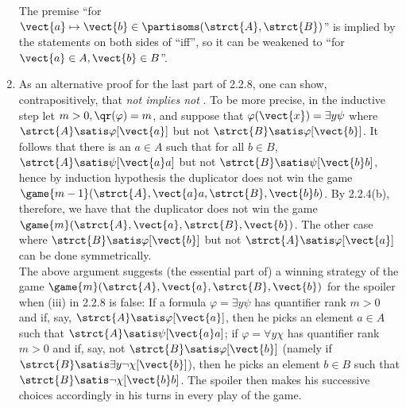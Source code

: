 \begin{enumerate}[1.]
\begin{remark}
The premise ``for $\vect{a} \mapsto \vect{b} \in \partisoms(\strct{A}, \strct{B})$'' is implied by the statements on both sides of ``iff'', so it can be weakened to ``for $\vect{a} \in A, \vect{b} \in B$''.
\end{remark}
%
\item {} As an alternative proof for the last part of 2.2.8, one can show, contrapositively, that \emph{not  implies not }. To be more precise, in the inductive step let $m > 0, \qr(\varphi) = m$, and suppose that $\varphi(\vect{x}) = \exists y \psi$ where $\strct{A} \satis \varphi[\vect{a}]$ but not $\strct{B} \satis \varphi[\vect{b}]$. It follows that there is an $a \in A$ such that for all $b \in B$, $\strct{A} \satis \psi[\vect{a}a]$ but not $\strct{B} \satis \psi[\vect{b}b]$, hence by induction hypothesis the duplicator does not win the game $\game{m - 1}(\strct{A}, \vect{a}a, \strct{B}, \vect{b}b)$. By 2.2.4(b), therefore, we have that the duplicator does not win the game $\game{m}(\strct{A}, \vect{a}, \strct{B}, \vect{b})$. The other case where $\strct{B} \satis \varphi[\vect{b}]$ but not $\strct{A} \satis \varphi[\vect{a}]$ can be done symmetrically.
\medskip\\
The above argument suggests (the essential part of) a winning strategy of the game $\game{m}(\strct{A}, \vect{a}, \strct{B}, \vect{b})$ for the spoiler when (iii) in 2.2.8 is false: If a formula $\varphi = \exists y \psi$ has quantifier rank $m > 0$ and if, say, $\strct{A} \satis \varphi[\vect{a}]$, then he picks an element $a \in A$ such that $\strct{A} \satis \psi[\vect{a}a]$; if $\varphi = \forall y \chi$ has quantifier rank $m > 0$ and if, say, not $\strct{B} \satis \varphi[\vect{b}]$ (namely if $\strct{B} \satis \exists y \neg\chi[\vect{b}]$), then he picks an element $b \in B$ such that $\strct{B} \satis \neg\chi[\vect{b}b]$. The spoiler then makes his successive choices accordingly in his turns in every play of the game.
%
\end{enumerate}


